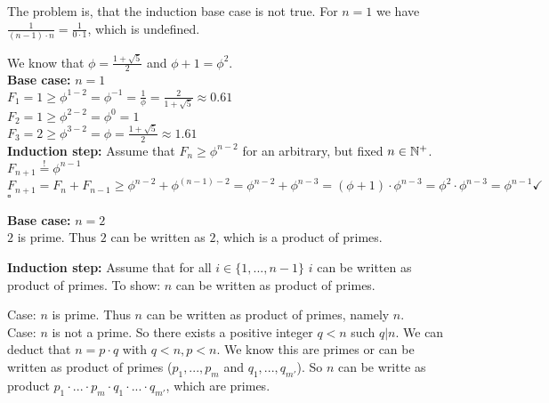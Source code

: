 The problem is, that the induction base case is not true. For $n=1$ we have $\frac{1}{(n-1)\cdot n} = \frac{1}{0 \cdot 1}$, which is undefined.

\label{ex:section1.2-4}
We know that $\phi = \frac{1+\sqrt{5}}{2}$ and $\phi + 1 = \phi^2$. \\

\textbf{Base case:} $n = 1$ \\
$F_1 = 1 \geq \phi^{1-2} = \phi^{-1} = \frac{1}{\phi} = \frac{2}{1+\sqrt{5}} \approx 0.61$ \\
$F_2 = 1 \geq \phi^{2-2} = \phi^0 = 1$ \\
$F_3 = 2 \geq \phi^{3-2} = \phi = \frac{1+\sqrt{5}}{2} \approx 1.61$ \\

\textbf{Induction step:} Assume that $F_n \geq \phi^{n-2}$ for an arbitrary, but fixed $n \in \mathbb{N}^+$. \\
$F_{n+1} \stackrel{!}{=} \phi^{n-1}$ \\
$F_{n+1} = F_n + F_{n-1} \geq \phi^{n-2} + \phi^{(n-1)-2} = \phi^{n-2} + \phi^{n-3} = (\phi + 1)\cdot\phi^{n-3} = \phi^2\cdot \phi^{n-3} = \phi^{n-1} \checkmark$
$\square$

\label{ex:section1.2-5}

\textbf{Base case:} $n = 2$ \\
$2$ is prime. Thus $2$ can be written as $2$, which is a product of primes.

\textbf{Induction step:} Assume that for all $i \in \{1, ..., n-1\}$ $i$ can be written as product of primes.
To show: $n$ can be written as product of primes.

Case: $n$ is prime. Thus $n$ can be written as product of primes, namely $n$. \\

Case: $n$ is not a prime. So there exists a positive integer $q < n$ such $q|n$.
We can deduct that $n = p \cdot q$ with $q<n,p<n$. We know this are primes or can be written as product of primes ($p_1, ..., p_m$ and $q_1, ..., q_{m'}$). So $n$ can be writte as product $p_1 \cdot ... \cdot p_m \cdot q_1 \cdot ... \cdot q_{m'}$, which are primes.

